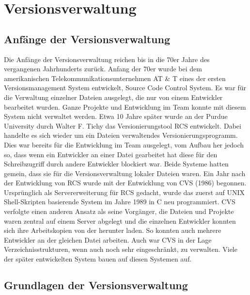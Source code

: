 \section{Versionsverwaltung}
\subsection{Anfänge der Versionsverwaltung}
Die Anfänge der Versionsverwaltung reichen bis in die 70er Jahre des vergangenen Jahrhunderts zurück. Anfang der 70er wurde bei dem amerikanischen Telekommunikationsunternehmen AT \& T eines der ersten Versionsmanagement System entwickelt, Source Code Control System. Es war für die Verwaltung einzelner Dateien ausgelegt, die nur von einem Entwickler bearbeitet wurden. Ganze Projekte und Entwicklung im Team konnte mit diesem System nicht verwaltet werden. 
Etwa 10 Jahre später wurde an der Purdue University durch Walter F. Tichy das Versionierungstool RCS entwickelt. Dabei handelte es sich wieder um ein Dateien verwaltendes Versionierungsprogramm. Dies war bereits für die Entwicklung im Team ausgelegt, vom Aufbau her jedoch so, dass wenn ein Entwickler an einer Datei gearbeitet hat diese für den Schreibzugriff durch andere Entwickler blockiert war. Beide Systeme hatten gemein, dass sie für die Versionsverwaltung lokaler Dateien waren.
Ein Jahr nach der Entwicklung von RCS wurde mit der Entwicklung von CVS (1986) begonnen. Ursprünglich als Servererweiterung für RCS gedacht, wurde das zuerst auf UNIX Shell-Skripten basierende System im Jahre 1989 in C neu programmiert. CVS verfolgte einen anderen Ansatz als seine Vorgänger, die Dateien und Projekte waren zentral auf einem Server abgelegt und die einzelnen Entwickler konnten sich ihre Arbeitskopien von der herunter laden. So konnten auch mehrere Entwickler an der gleichen Datei arbeiten. Auch war CVS in der Lage Verzeichnisstrukturen, wenn auch noch sehr eingeschränkt, zu verwalten. 
Viele der später entwickelten System bauen auf diesen Systemen auf.





\subsection{Grundlagen der Versionsverwaltung}


